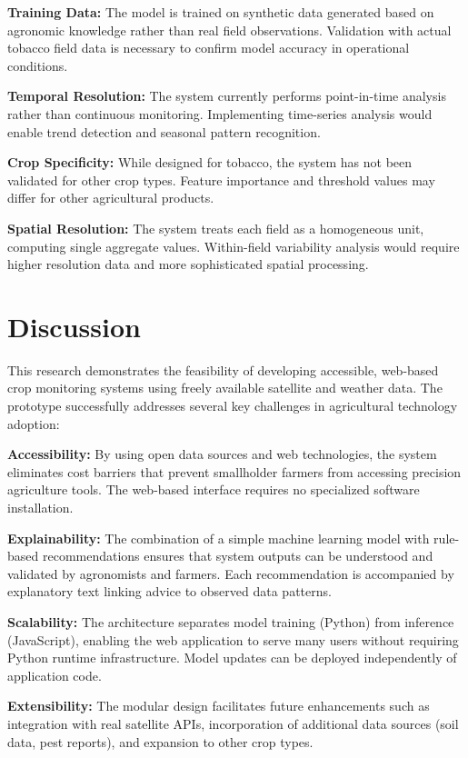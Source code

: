 \documentclass[journal]{IEEEtran}
\begin{document}
\textbf{Training Data:} The model is trained on synthetic data generated based on agronomic knowledge rather than real field observations. Validation with actual tobacco field data is necessary to confirm model accuracy in operational conditions.

\textbf{Temporal Resolution:} The system currently performs point-in-time analysis rather than continuous monitoring. Implementing time-series analysis would enable trend detection and seasonal pattern recognition.

\textbf{Crop Specificity:} While designed for tobacco, the system has not been validated for other crop types. Feature importance and threshold values may differ for other agricultural products.

\textbf{Spatial Resolution:} The system treats each field as a homogeneous unit, computing single aggregate values. Within-field variability analysis would require higher resolution data and more sophisticated spatial processing.

\section{Discussion}

This research demonstrates the feasibility of developing accessible, web-based crop monitoring systems using freely available satellite and weather data. The prototype successfully addresses several key challenges in agricultural technology adoption:

\textbf{Accessibility:} By using open data sources and web technologies, the system eliminates cost barriers that prevent smallholder farmers from accessing precision agriculture tools. The web-based interface requires no specialized software installation.

\textbf{Explainability:} The combination of a simple machine learning model with rule-based recommendations ensures that system outputs can be understood and validated by agronomists and farmers. Each recommendation is accompanied by explanatory text linking advice to observed data patterns.

\textbf{Scalability:} The architecture separates model training (Python) from inference (JavaScript), enabling the web application to serve many users without requiring Python runtime infrastructure. Model updates can be deployed independently of application code.

\textbf{Extensibility:} The modular design facilitates future enhancements such as integration with real satellite APIs, incorporation of additional data sources (soil data, pest reports), and expansion to other crop types.
\end{document}
